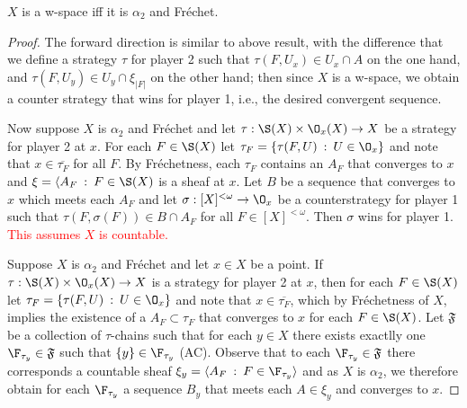 \documentclass{article}
\begin{document}
\begin{prop}
    \(X\) is a w-space iff it is  \(\alpha_2\) and Fréchet.
\end{prop}
\begin{proof}
    The forward direction is similar to above result, with the difference that we define a strategy \(\tau\) for player 2 such that \(\tau(F, U_x) \in U_x \cap A\) on the one hand, and \(\tau(F, U_y) \in U_y \cap \xi_{|F|}\) on the other hand; then since \(X\) is a w-space, we obtain a counter strategy that wins for player 1, i.e., the desired convergent sequence.

    Now suppose \(X\) is \(\alpha_2\) and Fréchet and let \(\tau: \S(X) \times \O_x(X) \to X\) be a strategy for player 2 at \(x\). For each \(F \in \S(X)\) let \(\tau_F = \{\tau(F, U) \: : \: U \in \O_x\}\) and note that \(x \in \overline{\tau_F}\) for all \(F\). By Fréchetness, each \(\tau_F\) contains an \(A_F\) that converges to \(x\) and \(\xi = \langle A_F \: : \: F \in \S(X)\)  is a sheaf at \(x\). Let \(B\) be a sequence that converges to \(x\) which meets each \(A_F\) and let \(\sigma: [X]^{< \omega} \to \O_x\) be a counterstrategy for player 1 such that \(\tau(F, \sigma(F)) \in B \cap A_F\) for all \(F \in [X]^{< \omega}\). Then \(\sigma\) wins for player 1. \textcolor{red}{This assumes $X$ is countable.}

    Suppose \(X\) is \(\alpha_2\) and Fréchet and let \(x \in X\) be a point. If \(\tau: \S(X) \times \O_x(X) \to X\) is a strategy for player 2 at \(x\), then for each \(F \in \S(X)\) let \(\tau_F = \{\tau(F, U) \: : \: U \in \O_x\}\) and note that \(x \in \overline{\tau_F}\), which by Fréchetness of \(X\), implies the existence of a \(A_F \subset \tau_F\) that converges to \(x\)  for each \(F \in \S(X)\). Let \(\mathfrak{F}\) be a collection of \(\tau\)-chains such that for each \(y \in X\) there exists exactlly one \(\F_{\tau_y} \in \mathfrak{F}\) such that \(\{y\} \in \F_{\tau_y}\) (AC). Observe that to each \(\F_{\tau_y} \in\mathfrak{F}\) there corresponds a countable sheaf \(\xi_y = \langle A_F \: : \: F \in \F_{\tau_y}\rangle\) and as \(X\) is \(\alpha_2\), we therefore obtain for each \(\F_{\tau_y}\) a sequence \(B_y\) that meets each \(A \in\xi_y\) and converges to \(x\). 
    

\end{proof}
\end{document}
